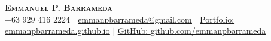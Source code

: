 \documentclass[legal,10pt]{article}
\begin{document}

\begin{center}
    \textbf{\Huge \scshape Emmanuel P. Barrameda} \\ \vspace{1pt}
    \footnotesize
    +63 929 416 2224 $|$ \href{mailto:emmanpbarrameda@gmail.com}{\underline{emmanpbarrameda@gmail.com}} $|$ 
    \href{https://emmanpbarrameda.github.io/}
    {Portfolio: \underline{emmanpbarrameda.github.io}} $|$
    \href{https://github.com/emmanpbarrameda}
    {GitHub: \underline{github.com/emmanpbarrameda}}
    \normalsize
\end{center}




\end{document}
